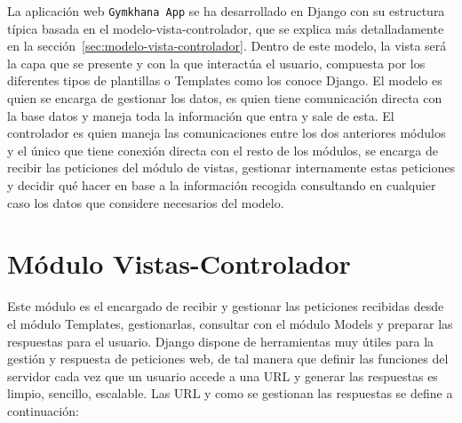 \documentclass[a4paper, 12pt]{book}
\begin{document}
La aplicación web \texttt{Gymkhana App} se ha desarrollado en Django con su estructura típica basada en el modelo-vista-controlador, que se explica más detalladamente en la sección~\ref{sec:modelo-vista-controlador}. Dentro de este modelo, la vista será la capa que se presente y con la que interactúa el usuario, compuesta por los diferentes tipos de plantillas o Templates como los conoce Django. El modelo es quien se encarga de gestionar los datos, es quien tiene comunicación directa con la base datos y maneja toda la información que entra y sale de esta. El controlador es quien maneja las comunicaciones entre los dos anteriores módulos y el único que tiene conexión directa con el resto de los módulos, se encarga de recibir las peticiones del módulo de vistas, gestionar internamente estas peticiones y decidir qué hacer en base a la información recogida consultando en cualquier caso los datos que considere necesarios del modelo. 


\section{Módulo Vistas-Controlador}
Este módulo es el encargado de recibir y gestionar las peticiones recibidas desde el módulo Templates, gestionarlas, consultar con el módulo Models y preparar las respuestas para el usuario. Django dispone de herramientas muy útiles para la gestión y respuesta de peticiones web, de tal manera que definir las funciones del servidor cada vez que un usuario accede a una URL y generar las respuestas es limpio, sencillo, escalable. 
Las URL y como se gestionan las respuestas se define a continuación: 
\end{document}
